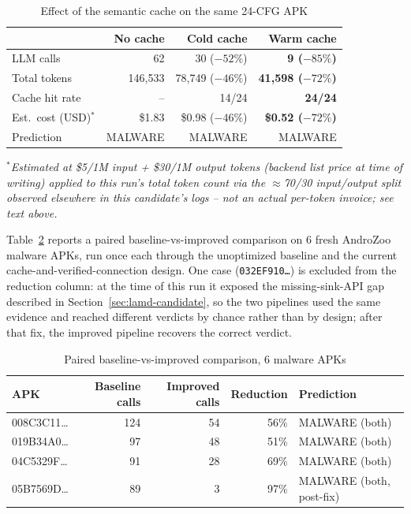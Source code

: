 \begin{table}[ht]
\centering
\caption{Effect of the semantic cache on the same 24-CFG APK}
\label{tab:cache-ablation}
\begin{tabular}{@{}lrrr@{}}
\toprule
 & No cache & Cold cache & Warm cache \\
\midrule
LLM calls        & 62      & 30 ($-52\%$)  & \textbf{9 ($-85\%$)} \\
Total tokens      & 146{,}533 & 78{,}749 ($-46\%$) & \textbf{41{,}598 ($-72\%$)} \\
Cache hit rate    & --      & 14/24         & \textbf{24/24} \\
Est.\ cost (USD)$^*$ & \$1.83 & \$0.98 ($-46\%$) & \textbf{\$0.52 ($-72\%$)} \\
Prediction        & MALWARE & MALWARE       & MALWARE \\
\bottomrule
\end{tabular}
\vspace{2pt}
\footnotesize\textit{$^*$Estimated at \$5/1M input + \$30/1M output tokens
(backend list price at time of writing) applied to this run's total token
count via the $\approx$70/30 input/output split observed elsewhere in this
candidate's logs -- not an actual per-token invoice; see text above.}
\end{table}

Table~\ref{tab:paired-comparison} reports a paired baseline-vs-improved
comparison on 6 fresh AndroZoo malware APKs, run once each through the
unoptimized baseline and the current cache-and-verified-connection design.
One case (\texttt{032EF910\ldots}) is excluded from the reduction column: at
the time of this run it exposed the missing-sink-API gap described in
Section~\ref{sec:lamd-candidate}, so the two pipelines used the same evidence
and reached different verdicts by chance rather than by design; after that
fix, the improved pipeline recovers the correct verdict.

\begin{table}[ht]
\centering
\caption{Paired baseline-vs-improved comparison, 6 malware APKs}
\label{tab:paired-comparison}
\begin{tabular}{@{}lrrrl@{}}
\toprule
APK & Baseline calls & Improved calls & Reduction & Prediction \\
\midrule
008C3C11\ldots & 124 & 54 & 56\% & MALWARE (both) \\
019B34A0\ldots & 97  & 48 & 51\% & MALWARE (both) \\
04C5329F\ldots  & 91  & 28 & 69\% & MALWARE (both) \\
05B7569D\ldots  & 89  & 3  & 97\% & MALWARE (both, post-fix) \\
\bottomrule
\end{tabular}
\end{table}

